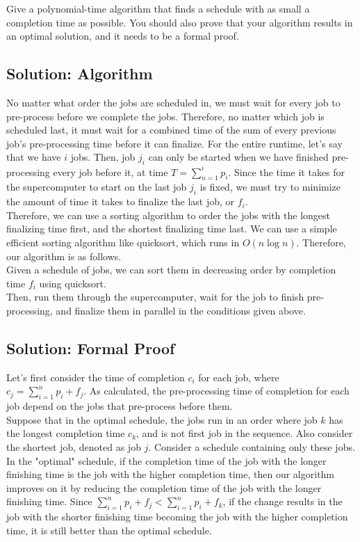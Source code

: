 \documentclass[letter,11pt]{article}
\begin{document}
Give a polynomial-time algorithm that finds a schedule with as small a completion time as possible. You should also prove that your algorithm results in an optimal solution, and it needs to be a formal proof.

\subsection{Solution: Algorithm}

No matter what order the jobs are scheduled in, we must wait for every job to pre-process before we complete the jobs. Therefore, no matter which job is scheduled last, it must wait for a combined time of the sum of every previous job's pre-processing time before it can finalize. For the entire runtime, let's say that we have $i$ jobs. Then, job $j_i$ can only be started when we have finished pre-processing every job before it, at time $T = \sum^{i}_{n=1} p_i$. Since the time it takes for the supercomputer to start on the last job $j_i$ is fixed, we must try to minimize the amount of time it takes to finalize the last job, or $f_i$. \\

Therefore, we can use a sorting algorithm to order the jobs with the longest finalizing time first, and the shortest finalizing time last. We can use a simple efficient sorting algorithm like quicksort, which runs in $O(n\log{}n)$.  Therefore, our algorithm is as follows. \\

Given a schedule of jobs, we can sort them in decreasing order by completion time $f_i$ using quicksort. \\

Then, run them through the supercomputer, wait for the job to finish pre-processing, and finalize them in parallel in the conditions given above.\\

\subsection{Solution: Formal Proof}

Let's first consider the time of completion $c_i$ for each job, where $c_j = \sum_{i=1}^{n}{p_i} + f_j$. As calculated, the pre-processing time of completion for each job depend on the jobs that pre-process before them. \\

Suppose that in the optimal schedule, the jobs run in an order where job $k$ has the longest completion time $c_k$, and is not first job in the sequence. Also consider the shortest job, denoted as job $j$. Consider a schedule containing only these jobs. In the "optimal" schedule, if the completion time of the job with the longer finishing time is the job with the higher completion time, then our algorithm improves on it by reducing the completion time of the job with the longer finishing time. Since $\sum_{i=1}^{n}{p_i} + f_j < \sum_{i=1}^{n}{p_i} + f_k$, if the change results in the job with the shorter finishing time becoming the job with the higher completion time, it is still better than the optimal schedule.\\
\end{document}
